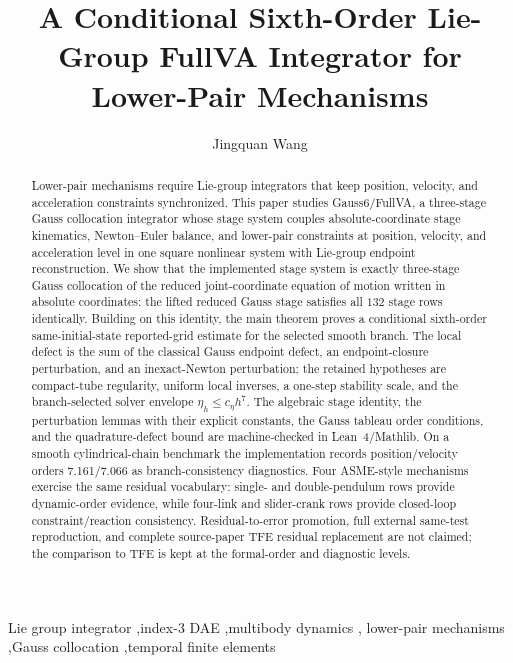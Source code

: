 \documentclass[preprint,12pt]{elsarticle}
\newcommand{\method}{Gauss6\slash FullVA}
\newcommand{\tfe}{TFE}
\begin{document}
\begin{frontmatter}

\title{A Conditional Sixth-Order Lie-Group FullVA Integrator for Lower-Pair Mechanisms}

\author[inst1]{Jingquan Wang}


\begin{abstract}
Lower-pair mechanisms require Lie-group integrators that keep position,
velocity, and acceleration constraints synchronized. This paper studies
\method{}, a three-stage Gauss collocation integrator whose stage system
couples absolute-coordinate stage kinematics, Newton--Euler balance, and
lower-pair constraints at position, velocity, and acceleration level in one
square nonlinear system with Lie-group endpoint reconstruction. We show that
the implemented stage system is exactly three-stage Gauss collocation of the
reduced joint-coordinate equation of motion written in absolute coordinates:
the lifted reduced Gauss stage satisfies all $132$ stage rows identically.
Building on this identity, the main theorem proves a conditional sixth-order
same-initial-state reported-grid estimate for the selected smooth branch. The
local defect is the sum of the classical Gauss endpoint defect, an
endpoint-closure perturbation, and an inexact-Newton perturbation; the retained
hypotheses are compact-tube regularity, uniform local inverses, a one-step
stability scale, and the branch-selected solver envelope
\(\eta_h\le c_\eta h^7\). The algebraic stage identity, the perturbation
lemmas with their explicit constants, the Gauss tableau order conditions, and
the quadrature-defect bound are machine-checked in Lean~4/Mathlib. On a smooth
cylindrical-chain benchmark the implementation records position/velocity
orders 7.161/7.066 as branch-consistency diagnostics. Four ASME-style
mechanisms exercise the same residual vocabulary: single- and double-pendulum
rows provide dynamic-order evidence, while four-link and slider-crank rows
provide closed-loop constraint/reaction consistency. Residual-to-error
promotion, full external same-test reproduction, and complete source-paper
\tfe{} residual replacement are not claimed; the comparison to \tfe{} is kept
at the formal-order and diagnostic levels.
\end{abstract}

\begin{keyword}
Lie group integrator \sep index-3 DAE \sep multibody dynamics \sep
lower-pair mechanisms \sep Gauss collocation \sep temporal finite elements
\end{keyword}

\end{frontmatter}
\end{document}
